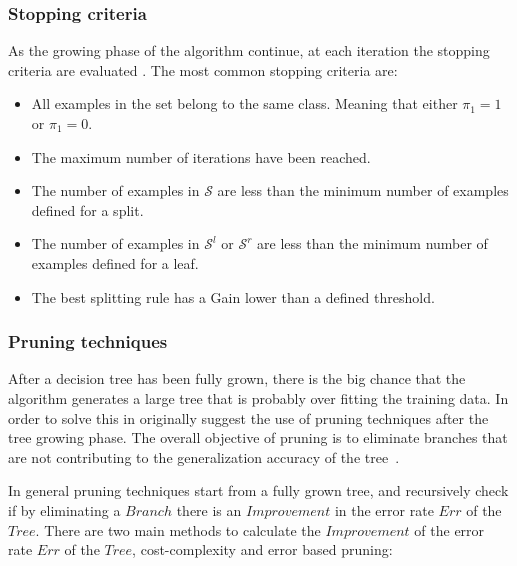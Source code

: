   
\subsubsection{Stopping criteria}
As the growing phase of the algorithm continue, at each iteration the stopping criteria are 
evaluated \citep{Rokach2010}. The most common stopping criteria are:
 \begin{itemize}
   \item All examples in the set belong to the same class. Meaning that either $\pi_1=1$ or 
    $\pi_1=0$.

  \item The maximum number of iterations have been reached.
  
  \item The number of examples in $\mathcal{S}$ are less than the minimum number of examples 
defined for a split.
  
  \item The number of examples in $\mathcal{S}^l$ or $\mathcal{S}^r$ are less than the minimum 
number of examples defined for a leaf.
  
  \item The best splitting rule has a Gain lower than a defined threshold.
\end{itemize}


\subsubsection{Pruning techniques}
After a decision tree has been fully grown, there is the big chance that  the algorithm generates a 
large tree that is probably over fitting the  training data. In order to solve this in 
\citep{Breiman1984a} originally suggest the use of pruning techniques after the tree growing phase.
The overall objective of pruning is to eliminate branches that are not contributing
to the generalization accuracy of the \mbox{tree \citep{Rokach2010}.}
 
In general pruning techniques start from a fully grown tree, and recursively check if by 
eliminating 
a $Branch$ there is an $Improvement$ in the error rate $Err$ of the $Tree$.  There are two 
main 
methods to calculate the $Improvement$ of the error rate $Err$ of the $Tree$, cost-complexity 
and  error based pruning:
  

